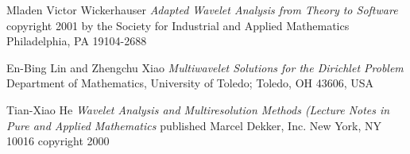 \documentclass[11pt]{report}
\begin{document}
\begin{thebibliography}{99}
 Mladen Victor Wickerhauser \textsl {Adapted Wavelet Analysis from Theory to Software} copyright 2001 by the Society for Industrial and Applied Mathematics Philadelphia, PA 19104-2688

\bibitem En-Bing Lin and Zhengchu Xiao \textsl {Multiwavelet Solutions for the Dirichlet Problem} Department of Mathematics, University of Toledo; Toledo, OH 43606, USA

\bibitem Tian-Xiao He \textsl {Wavelet Analysis and Multiresolution Methods (Lecture Notes in Pure and Applied Mathematics} published Marcel Dekker, Inc.  New York, NY 10016 copyright 2000

\end{thebibliography}

 
\end{document}
